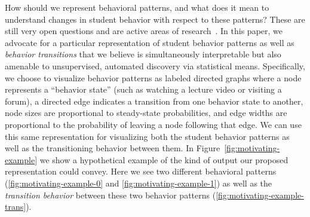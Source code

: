 How should we represent behavioral patterns, and what does it mean to
understand changes in student behavior with respect to these patterns?
These are still very open questions and are active areas of
research~\cite{Kizilcec:2013:LAK, Faucon:2016:EDM, Davis:2016:EDM,
Shih:2010:EDM}. In this paper, we advocate for a particular representation
of student behavior patterns as well as \emph{behavior transitions} that we
believe is simultaneously interpretable but also amenable to unsupervised,
automated discovery via statistical means. Specifically, we choose to
visualize behavior patterns as labeled directed graphs where a node
represents a ``behavior state'' (such as watching a lecture video or
visiting a forum), a directed edge indicates a transition from one
behavior state to another, node sizes are proportional to steady-state
probabilities, and edge widths are proportional to the probability of
leaving a node following that edge. We can use this same representation for
visualizing both the student behavior patterns as well as the transitioning
behavior between them. In Figure~\ref{fig:motivating-example} we show a
hypothetical example of the kind of output our proposed representation
could convey.  Here we see two different behavioral patterns
(\ref{fig:motivating-example-0} and \ref{fig:motivating-example-1}) as well
as the \emph{transition behavior} between these two behavior patterns
(\ref{fig:motivating-example-trans}).
